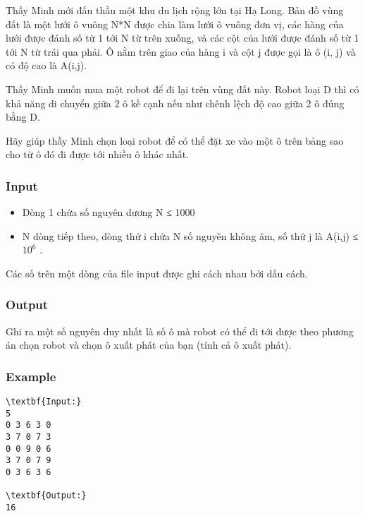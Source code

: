 



   Thầy Minh mới đấu thầu một khu du lịch rộng lớn tại Hạ Long. Bản đồ vùng đất là một lưới ô vuông N*N được chia làm lưới ô vuông đơn vị, các hàng của lưới được đánh số từ 1 tới N từ trên xuống, và các cột của lưới được đánh số từ 1 tới N từ trái qua phải. Ô nằm trên giao của hàng i và cột j được gọi là ô (i, j) và có độ cao là A(i,j).  

   Thầy Minh muốn mua một robot để đi lại trên vùng đất này. Robot loại D thì có khả năng di chuyển giữa 2 ô kề cạnh nếu như chênh lệch độ cao giữa 2 ô đúng bằng D.  

   Hãy giúp thầy Minh chọn loại robot để có thể đặt xe vào một ô trên bảng sao cho từ ô đó đi được tới nhiều ô khác nhất.  

\subsubsection{   Input  }
\begin{itemize}
	\item     Dòng 1 chứa số nguyên dương N ≤ 1000   
	\item     N dòng tiếp theo, dòng thứ i chứa N số nguyên không âm, số thứ j là A(i,j)         ≤ $10^{6}$     .    
\end{itemize}

   Các số trên một dòng của file input được ghi cách nhau bởi dấu cách.  

\subsubsection{   Output  }

   Ghi ra một số nguyên duy nhất là số ô mà robot có thể đi tới được theo phương án chọn robot và chọn ô xuất phát của bạn (tính cả ô xuất phát).  

\subsubsection{   Example  }
\begin{verbatim}
\textbf{Input:}
5
0 3 6 3 0 
3 7 0 7 3 
0 0 9 0 6 
3 7 0 7 9 
0 3 6 3 6

\textbf{Output:}
16
\end{verbatim}
